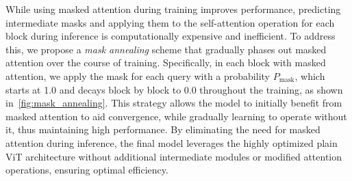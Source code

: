 \documentclass[10pt,twocolumn,letterpaper]{article}
\newcommand{\PAR}[1]{\vskip4pt \noindent {\bf #1~}}
\begin{document}
\PAR{Mask annealing.}
While using masked attention during training improves performance, predicting intermediate masks and applying them to the self-attention operation for each block during inference is computationally expensive and inefficient.
To address this, we propose a \textit{mask annealing} scheme that gradually phases out masked attention over the course of training.
Specifically, in each block with masked attention, we apply the mask for each query with a probability $P_\textrm{mask}$, which starts at 1.0 and decays block by block to 0.0 throughout the training, as shown in~\cref{fig:mask_annealing}.
This strategy allows the model to initially benefit from masked attention to aid convergence, while gradually learning to operate without it, thus maintaining high performance. By eliminating the need for masked attention during inference, the final model leverages the highly optimized plain ViT architecture without additional intermediate modules or modified attention operations, ensuring optimal efficiency.
\end{document}
